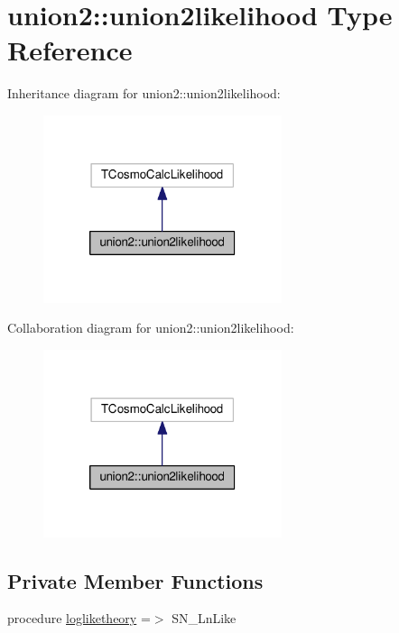 \hypertarget{structunion2_1_1union2likelihood}{}\section{union2\+:\+:union2likelihood Type Reference}
\label{structunion2_1_1union2likelihood}


Inheritance diagram for union2\+:\+:union2likelihood\+:
\nopagebreak
\begin{figure}[H]
\begin{center}
\leavevmode
\includegraphics[width=198pt]{structunion2_1_1union2likelihood__inherit__graph}
\end{center}
\end{figure}


Collaboration diagram for union2\+:\+:union2likelihood\+:
\nopagebreak
\begin{figure}[H]
\begin{center}
\leavevmode
\includegraphics[width=198pt]{structunion2_1_1union2likelihood__coll__graph}
\end{center}
\end{figure}
\subsection*{Private Member Functions}
\begin{DoxyCompactItemize}
\item 
procedure \mbox{\hyperlink{structunion2_1_1union2likelihood_aa1eacea20f0e7bf3c7240826272ca6d4}{logliketheory}} =$>$ S\+N\+\_\+\+Ln\+Like
\end{DoxyCompactItemize}
